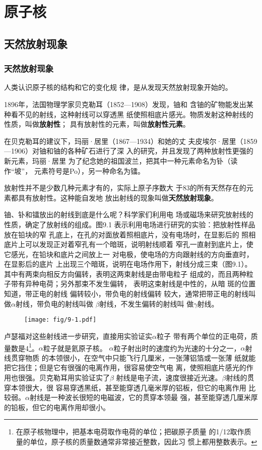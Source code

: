 \chapter{原子核}
\section{天然放射现象}

\subsection{天然放射现象}

人类认识原子核的结构和它的变化规
律，是从发现天然放射现象开始的。

1896年，法国物理学家贝克勒耳（1852—1908）发现，铀和
含铀的矿物能发出某种看不见的射线，这种射线可以穿透黑
纸使照相底片感光。物质发射这种射线的性质，叫做\textbf{放射性}；
具有放射性的元素，叫做\textbf{放射性元素}。

在贝克勒耳的建议下，玛丽·居里（1867—1934）和她的丈
夫皮埃尔·居里（1859—1906）对铀和铀的各种矿石进行了深
入的研究，并且发现了两种放射性更强的新元素，玛丽·居里
为了纪念她的祖国波兰，把其中一种元素命名为钋（读作“坡”，
元素符号是Po），另一种命名为镭。

放射性并不是少数几种元素才有的，实际上原子序数大
于83的所有天然存在的元素都具有放射性。这种能自发地
放出射线的现象叫做\textbf{天然放射现象}。

铀、钋和镭放出的射线到底是什么呢？科学家们利用电
场或磁场来研究放射线的性质，确定了放射线的组成。图9.1
表示利用电场进行研究的实验：把放射性样品放在铅块的窄
孔底上，在孔的对面放着照相底片，没有电场时，在显影后的
照相底片上可以发现正对着窄孔有一个暗斑，说明射线顺着
窄孔一直射到底片上，使它感光，在铅块和底片之间放上一
对电极，使电场的方向跟射线的方向垂直时，在显影后的底片
上出现三个暗斑，说明在电场作用下，射线分成三束（图9.1）。
其中有两束向相反方向偏转，表明这两束射线是由带电粒子
组成的，而且两种粒子带有异种电荷；另外那束不发生偏转，
表明这束射线是中性的，从暗
斑的位置知道，带正电的射线
偏转较小，带负电的射线偏转
较大，通常把带正电的射线叫
做$\alpha$射线，带负电的射线叫做
$\beta$射线，不发生偏转的射线叫
做$\gamma$射线。

\begin{figure}[htp]
    \centering
    \texttt{[image: fig/9-1.pdf]}
    \caption{}
\end{figure}

卢瑟福对这些射线进一步研究，直接用实验证实$\alpha$粒子
带有两个单位的正电荷，质量数是4\footnote{在原子核物理中，把基本电荷取作电荷的单位；把碳原子质量
的1/12取作质量的单位，原子核的质量数通常非常接近整数，因此习
惯上都用整数表示。}。$\alpha$粒子就是氦原子核。
$\alpha$粒子射出时的速度约为光速的十分之一，$\alpha$射线贯穿物质
的本领很小，在空气中只能飞行几厘米，一张薄铝箔或一张薄
纸就能把它挡住；但是它有很强的电离作用，很容易使空气电
离，使照相底片感光的作用也很强。贝克勒耳用实验证实了$\beta$
射线是电子流，速度很接近光速。$\beta$射线的贯穿本领很大，很
容易穿透黑纸，甚至能穿透几毫米厚的铝板，但它的电离作用
比较弱。$\alpha$射线是一种波长很短的电磁波，它的贯穿本领最
强，甚至能穿透几厘米厚的铅板，但它的电离作用却很小。

